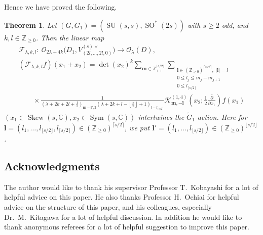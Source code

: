 \documentclass[pdftex]{sigma}
\numberwithin{equation}{section}
\newtheorem{Theorem}{Theorem}[section]
\newcommand{\bl}{\mathbf{l}}
\newcommand{\bm}{\mathbf{m}}
\newcommand{\BZ}{\mathbb{Z}}
\newcommand{\BC}{\mathbb{C}}
\newcommand{\cF}{\mathcal{F}}
\newcommand{\cK}{\mathcal{K}}
\newcommand{\cO}{\mathcal{O}}
\newcommand{\Sym}{\operatorname{Sym}}
\newcommand{\Skew}{\operatorname{Skew}}
\begin{document}
Hence we have proved the following.
\begin{Theorem}\label{main6}
Let $(G,G_1)=(\operatorname{SU}(s,s), \operatorname{SO}^*(2s))$ with $s\ge 2$ odd, and $k,l\in\BZ_{\ge 0}$. Then the linear map
\begin{gather*}
\cF_{\lambda,k,l}\colon \ \cO_{2\lambda+4k}\big(D_1,V_{(2l,\dots,2l,0)}^{(s)\vee}\big)\to \cO_\lambda(D), \\
(\cF_{\lambda,k,l}f)(x_1+x_2)=\det(x_2)^k\sum_{\bm\in\BZ_{++}^{\lfloor s/2\rfloor}}
\sum_{\substack{\bl\in(\BZ_{\ge 0})^{\lceil s/2\rceil},\; |\bl|=l\\ 0\le l_j\le m_j-m_{j+1}\\ 0\le l_{\lceil s/2\rceil}}}\\
\qquad{} \times\frac{1}{\left(\lambda+2k+2l+\frac{1}{2}\right)_{\bm-\bl',2}
\left(\lambda+2k+l-\left\lfloor\frac{s}{2}\right\rfloor+1\right)_{l-l_{\lceil s/2\rceil}}}
\cK_{\bm,-\bl}^{(1,4)}\left(x_2;\frac{1}{2}\overline{\frac{\partial}{\partial x_1}}\right)f(x_1)
\end{gather*}
$(x_1\in\Skew(s,\BC), x_2\in\Sym(s,\BC))$ intertwines the $\tilde{G}_1$-action. Here for $\bl=(l_1,\ldots,l_{\lfloor s/2\rfloor},\allowbreak l_{\lceil s/2\rceil})\in(\BZ_{\ge 0})^{\lceil s/2\rceil}$, we put $\bl'=(l_1,\ldots,l_{\lfloor s/2\rfloor})\in(\BZ_{\ge 0})^{\lfloor s/2\rfloor}$.
\end{Theorem}

\subsection*{Acknowledgments}
The author would like to thank his supervisor Professor T.~Kobayashi for a lot of helpful advice on this paper. He also thanks Professor H.~Ochiai for helpful advice on the structure of this paper, and his colleagues, especially Dr.~M.~Kitagawa for a lot of helpful discussion. In addition he would like to thank anonymous referees for a lot of helpful suggestion to improve this paper.
\end{document}
